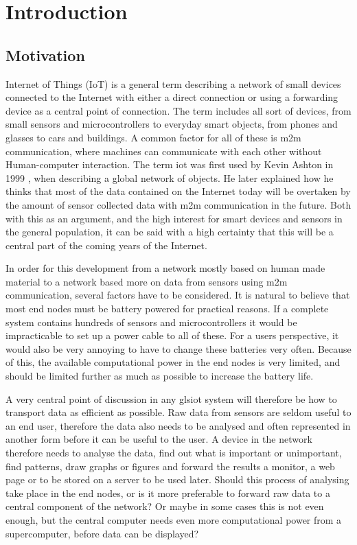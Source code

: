 \chapter{Introduction}
\label{chp:introduction} 


\section{Motivation}

Internet of Things (IoT) is a general term describing a network of small devices connected to the Internet with either a direct connection or using a forwarding device as a central point of connection. The term includes all sort of devices, from small sensors and microcontrollers to everyday smart objects, from phones and glasses to cars and buildings. A common factor for all of these is \gls{m2m} communication, where machines can communicate with each other without Human-computer interaction. The term \gls{iot} was first used by Kevin Ashton in 1999 \cite{ashton2009internet}, when describing a global network of objects. He later explained how he thinks that most of the data contained on the Internet today will be overtaken by the amount of sensor collected data with \gls{m2m} communication in the future. Both with this as an argument, and the high interest for smart devices and sensors in the general population, it can be said with a high certainty that this will be a central part of the coming years of the Internet. 

In order for this development from a network mostly based on human made material to a network based more on data from sensors using \gls{m2m} communication, several factors have to be considered. It is natural to believe that most end nodes must be battery powered for practical reasons. If a complete system contains hundreds of sensors and microcontrollers it would be impracticable to set up a power cable to all of these. For a users perspective, it would also be very annoying to have to change these batteries very often. Because of this, the available computational power in the end nodes is very limited, and should be limited further as much as possible to increase the battery life. 

A very central point of discussion in any gls{iot} system will therefore be how to transport data as efficient as possible. Raw data from sensors are seldom useful to an end user, therefore the data also needs to be analysed and often represented in another form before it can be useful to the user. A device in the network therefore needs to analyse the data, find out what is important or unimportant, find patterns, draw graphs or figures and forward the results a monitor, a web page or to be stored on a server to be used later. Should this process of analysing take place in the end nodes, or is it more preferable to forward raw data to a central component of the network? Or maybe in some cases this is not even enough, but the central computer needs even more computational power from a supercomputer, before data can be displayed?  


